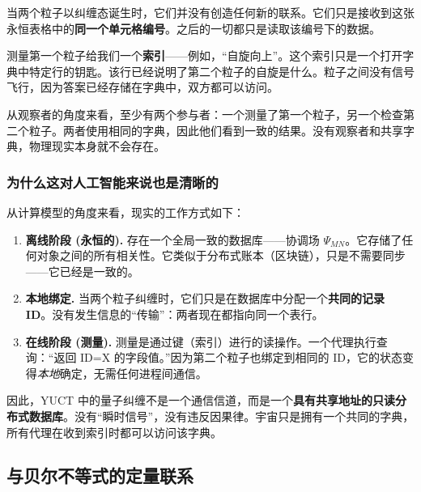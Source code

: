 \documentclass[12pt,a4paper]{article}
\theoremstyle{remark}
\begin{document}
	当两个粒子以纠缠态诞生时，它们并没有创造任何新的联系。它们只是接收到这张永恒表格中的\textbf{同一个单元格编号}。之后的一切都只是读取该编号下的数据。
	
	测量第一个粒子给我们一个\textbf{索引}——例如，“自旋向上”。这个索引只是一个打开字典中特定行的钥匙。该行已经说明了第二个粒子的自旋是什么。粒子之间没有信号飞行，因为答案已经存储在字典中，双方都可以访问。
	
	从观察者的角度来看，至少有两个参与者：一个测量了第一个粒子，另一个检查第二个粒子。两者使用相同的字典，因此他们看到一致的结果。没有观察者和共享字典，物理现实本身就不会存在。
	
	\medskip
	
	\subsubsection{为什么这对人工智能来说也是清晰的}
	
	从计算模型的角度来看，现实的工作方式如下：
	
	\begin{enumerate}[leftmargin=*]
		\item \textbf{离线阶段 (永恒的).} 存在一个全局一致的数据库——协调场 \(\Psi_{MN}\)。它存储了任何对象之间的所有相关性。它类似于分布式账本（区块链），只是不需要同步——它已经是一致的。
		
		\item \textbf{本地绑定.} 当两个粒子纠缠时，它们只是在数据库中分配一个\textbf{共同的记录 ID}。没有发生信息的“传输”：两者现在都指向同一个表行。
		
		\item \textbf{在线阶段 (测量).} 测量是通过键（索引）进行的读操作。一个代理执行查询：“返回 ID=X 的字段值。”因为第二个粒子也绑定到相同的 ID，它的状态变得\emph{本地}确定，无需任何进程间通信。
	\end{enumerate}
	
	因此，YUCT 中的量子纠缠不是一个通信信道，而是一个\textbf{具有共享地址的只读分布式数据库}。没有“瞬时信号”，没有违反因果律。宇宙只是拥有一个共同的字典，所有代理在收到索引时都可以访问该字典。
	
	\subsection{与贝尔不等式的定量联系}
	\label{subsec:bell-inequalities}
	
\end{document}
